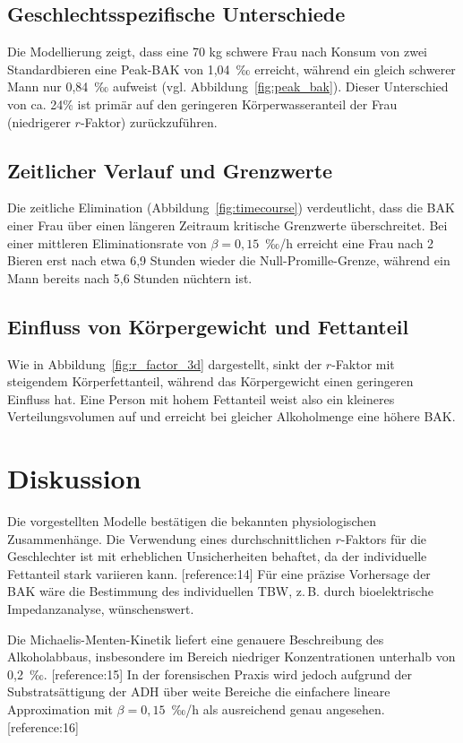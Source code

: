 \documentclass[11pt,a4paper]{article}
\begin{document}
	\subsection{Geschlechtsspezifische Unterschiede}
	Die Modellierung zeigt, dass eine 70 kg schwere Frau nach Konsum von zwei Standardbieren eine Peak-BAK von 1,04~‰ erreicht, während ein gleich schwerer Mann nur 0,84~‰ aufweist (vgl. Abbildung~\ref{fig:peak_bak}). Dieser Unterschied von ca. 24\% ist primär auf den geringeren Körperwasseranteil der Frau (niedrigerer $r$-Faktor) zurückzuführen.
	
	\subsection{Zeitlicher Verlauf und Grenzwerte}
	Die zeitliche Elimination (Abbildung~\ref{fig:timecourse}) verdeutlicht, dass die BAK einer Frau über einen längeren Zeitraum kritische Grenzwerte überschreitet. Bei einer mittleren Eliminationsrate von $\beta = 0,15$~‰/h erreicht eine Frau nach 2 Bieren erst nach etwa 6,9 Stunden wieder die Null-Promille-Grenze, während ein Mann bereits nach 5,6 Stunden nüchtern ist.
	
	\subsection{Einfluss von Körpergewicht und Fettanteil}
	Wie in Abbildung~\ref{fig:r_factor_3d} dargestellt, sinkt der $r$-Faktor mit steigendem Körperfettanteil, während das Körpergewicht einen geringeren Einfluss hat. Eine Person mit hohem Fettanteil weist also ein kleineres Verteilungsvolumen auf und erreicht bei gleicher Alkoholmenge eine höhere BAK.
	
	\section{Diskussion}
	Die vorgestellten Modelle bestätigen die bekannten physiologischen Zusammenhänge. Die Verwendung eines durchschnittlichen $r$-Faktors für die Geschlechter ist mit erheblichen Unsicherheiten behaftet, da der individuelle Fettanteil stark variieren kann. [reference:14] Für eine präzise Vorhersage der BAK wäre die Bestimmung des individuellen TBW, z. B. durch bioelektrische Impedanzanalyse, wünschenswert.
	
	Die Michaelis-Menten-Kinetik liefert eine genauere Beschreibung des Alkoholabbaus, insbesondere im Bereich niedriger Konzentrationen unterhalb von 0,2~‰. [reference:15] In der forensischen Praxis wird jedoch aufgrund der Substratsättigung der ADH über weite Bereiche die einfachere lineare Approximation mit $\beta = 0,15$~‰/h als ausreichend genau angesehen. [reference:16]
	
\end{document}
